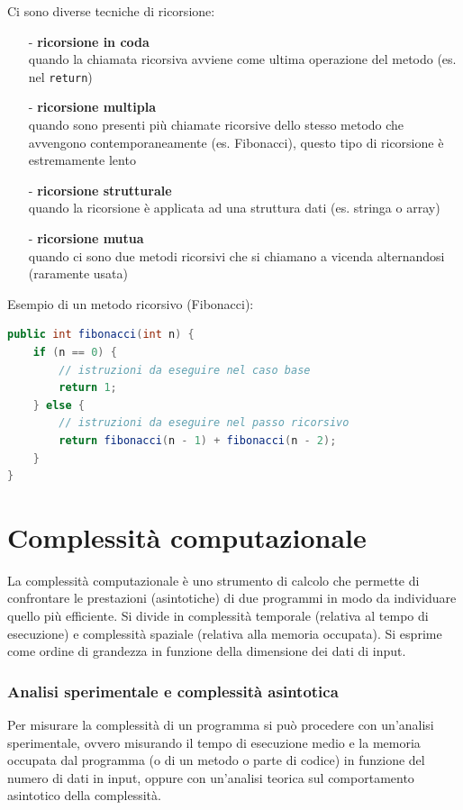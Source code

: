 \documentclass[a4paper]{article}
\begin{document}
Ci sono diverse tecniche di ricorsione:
\begin{itemize}
	\item[-] \textbf{ricorsione in coda} \\
	quando la chiamata ricorsiva avviene come ultima operazione del metodo (es. nel \verb|return|)
	\item[-] \textbf{ricorsione multipla} \\
	quando sono presenti più chiamate ricorsive dello stesso metodo che avvengono contemporaneamente (es. Fibonacci), questo tipo di
	ricorsione è estremamente lento
	\item[-] \textbf{ricorsione strutturale} \\
	quando la ricorsione è applicata ad una struttura dati (es. stringa o array)
	\item[-] \textbf{ricorsione mutua} \\
	quando ci sono due metodi ricorsivi che si chiamano a vicenda alternandosi (raramente usata)
\end{itemize}

Esempio di un metodo ricorsivo (Fibonacci):
\begin{lstlisting}[language=Java]
public int fibonacci(int n) {
	if (n == 0) {
		// istruzioni da eseguire nel caso base
		return 1;
	} else {
		// istruzioni da eseguire nel passo ricorsivo
		return fibonacci(n - 1) + fibonacci(n - 2);
	}
}
\end{lstlisting}


\section{Complessità computazionale}
La complessità computazionale è uno strumento di calcolo che permette di confrontare le prestazioni (asintotiche) di due programmi
in modo da individuare quello più efficiente. Si divide in complessità temporale (relativa al tempo di esecuzione) e complessità
spaziale (relativa alla memoria occupata). Si esprime come ordine di grandezza in funzione della dimensione dei dati di input.

\subsubsection*{Analisi sperimentale e complessità asintotica}
Per misurare la complessità di un programma si può procedere con un'analisi sperimentale, ovvero misurando il tempo di esecuzione
medio e la memoria occupata dal programma (o di un metodo o parte di codice) in funzione del numero di dati in input, oppure con
un'analisi teorica sul comportamento asintotico della complessità.
\end{document}
